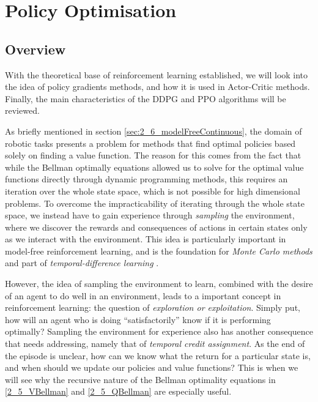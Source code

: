 \chapter{Policy Optimisation}
\label{chap:3_Optimisation}

\section{Overview}

With the theoretical base of reinforcement learning established, we will look into the idea of policy gradients methods, and how it is used in Actor-Critic methods. Finally, the main characteristics of the DDPG and PPO algorithms will be reviewed.

As briefly mentioned in section \ref{sec:2_6_modelFreeContinuous}, the domain of robotic tasks presents a problem for methods that find optimal policies based solely on finding a value function. 
The reason for this comes from the fact that while the Bellman optimally equations allowed us to solve for the optimal value functions directly through dynamic programming methods, this requires an iteration over the whole state space, which is not possible for high dimensional problems.
To overcome the impracticability of iterating through the whole state space, we instead have to gain experience through \textit{sampling} the environment, where we discover the rewards and consequences of actions in certain states only as we interact with the environment. This idea is particularly important in model-free reinforcement learning, and is the foundation for \textit{Monte Carlo methods} and part of \textit{temporal-difference learning} \cite{suttonAndBartoBook}.

However, the idea of sampling the environment to learn, combined with the desire of an agent to do well in an environment, leads to a important concept in reinforcement learning: the question of \textit{exploration or exploitation}. Simply put, how will an agent who is doing ``satisfactorily'' know if it is performing optimally? 
Sampling the environment for experience also has another consequence that needs addressing, namely that of \textit{temporal credit assignment}. As the end of the episode is unclear, how can we know what the return for a particular state is, and when should we update our policies and value functions? This is when we will see why the recursive nature of the Bellman optimality equations in \eqref{2_5_VBellman} and \eqref{2_5_QBellman} are especially useful.

